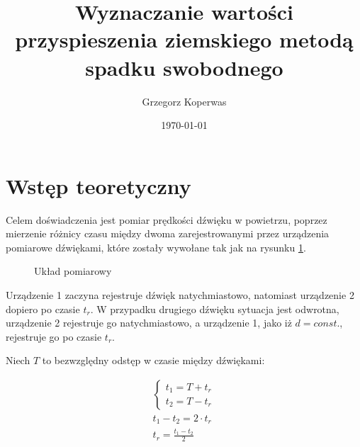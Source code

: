 \documentclass[a4paper,12pt]{article}
\title{Wyznaczanie wartości przyspieszenia ziemskiego metodą spadku swobodnego}
\author{Grzegorz Koperwas}
\date{\today}
\begin{document}

\section{Wstęp teoretyczny}

Celem doświadczenia jest pomiar prędkości dźwięku w powietrzu, poprzez mierzenie różnicy czasu między dwoma zarejestrowanymi przez urządzenia pomiarowe dźwiękami, które zostały wywołane tak jak na rysunku \ref{rys:układ}.

\begin{figure}[h]
    \centering
    \caption{Układ pomiarowy}\label{rys:układ}
\end{figure}

Urządzenie 1 zaczyna rejestruje dźwięk natychmiastowo, natomiast urządzenie 2 dopiero po czasie $t_r$. W przypadku drugiego dźwięku sytuacja jest odwrotna, urządzenie 2 rejestruje go natychmiastowo, a urządzenie 1, jako iż $d = const.$, rejestruje go po czasie $t_r$.

Niech $T$ to bezwzględny odstęp w czasie między dźwiękami:

\begin{gather*}
    \left\{ \begin{array}{l}
        t_1 = T + t_r\\
        t_2 = T - t_r
    \end{array} \right.\\
    t_1 - t_2 = 2\cdot t_r\\
    t_r = \frac{t_1 - t_2}{2}
\end{gather*}
\end{document}
